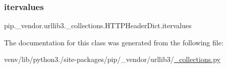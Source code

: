\subsubsection{\texorpdfstring{itervalues}{itervalues}}
{\footnotesize\ttfamily pip.\+\_\+vendor.\+urllib3.\+\_\+collections.\+H\+T\+T\+P\+Header\+Dict.\+itervalues\hspace{0.3cm}{\ttfamily [static]}}



The documentation for this class was generated from the following file\+:\begin{DoxyCompactItemize}
\item 
venv/lib/python3./site-\/packages/pip/\+\_\+vendor/urllib3/\hyperlink{__collections_8py}{\+\_\+collections.\+py}\end{DoxyCompactItemize}
